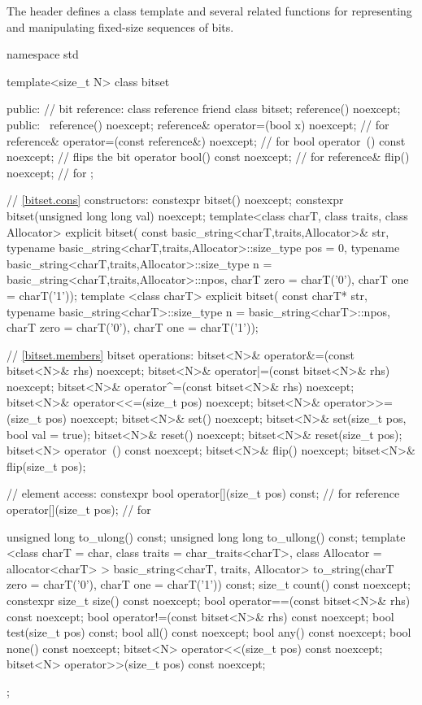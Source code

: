 \pnum
The header
defines a
class template
and several related functions for representing
and manipulating fixed-size sequences of bits.

\begin{codeblock}
namespace std {
  template<size_t N> class bitset {
  public:
    // bit reference:
    class reference {
      friend class bitset;
      reference() noexcept;
    public:
     ~reference() noexcept;
      reference& operator=(bool x) noexcept;             // for 
      reference& operator=(const reference&) noexcept;   // for 
      bool operator~() const noexcept;                   // flips the bit
      operator bool() const noexcept;                    // for 
      reference& flip() noexcept;                        // for 
    };

    // \ref{bitset.cons} constructors:
    constexpr bitset() noexcept;
    constexpr bitset(unsigned long long val) noexcept;
    template<class charT, class traits, class Allocator>
      explicit bitset(
        const basic_string<charT,traits,Allocator>& str,
        typename basic_string<charT,traits,Allocator>::size_type pos = 0,
        typename basic_string<charT,traits,Allocator>::size_type n =
          basic_string<charT,traits,Allocator>::npos,
          charT zero = charT('0'), charT one = charT('1'));
    template <class charT>
      explicit bitset(
        const charT* str,
        typename basic_string<charT>::size_type n = basic_string<charT>::npos,
        charT zero = charT('0'), charT one = charT('1'));

    // \ref{bitset.members} bitset operations:
    bitset<N>& operator&=(const bitset<N>& rhs) noexcept;
    bitset<N>& operator|=(const bitset<N>& rhs) noexcept;
    bitset<N>& operator^=(const bitset<N>& rhs) noexcept;
    bitset<N>& operator<<=(size_t pos) noexcept;
    bitset<N>& operator>>=(size_t pos) noexcept;
    bitset<N>& set() noexcept;
    bitset<N>& set(size_t pos, bool val = true);
    bitset<N>& reset() noexcept;
    bitset<N>& reset(size_t pos);
    bitset<N>  operator~() const noexcept;
    bitset<N>& flip() noexcept;
    bitset<N>& flip(size_t pos);

    // element access:
    constexpr bool operator[](size_t pos) const;       // for 
    reference operator[](size_t pos);                  // for 

    unsigned long to_ulong() const;
    unsigned long long to_ullong() const;
    template <class charT = char,
        class traits = char_traits<charT>,
        class Allocator = allocator<charT> >
      basic_string<charT, traits, Allocator>
      to_string(charT zero = charT('0'), charT one = charT('1')) const;
    size_t count() const noexcept;
    constexpr size_t size() const noexcept;
    bool operator==(const bitset<N>& rhs) const noexcept;
    bool operator!=(const bitset<N>& rhs) const noexcept;
    bool test(size_t pos) const;
    bool all() const noexcept;
    bool any() const noexcept;
    bool none() const noexcept;
    bitset<N> operator<<(size_t pos) const noexcept;
    bitset<N> operator>>(size_t pos) const noexcept;
  };

}
\end{codeblock}
